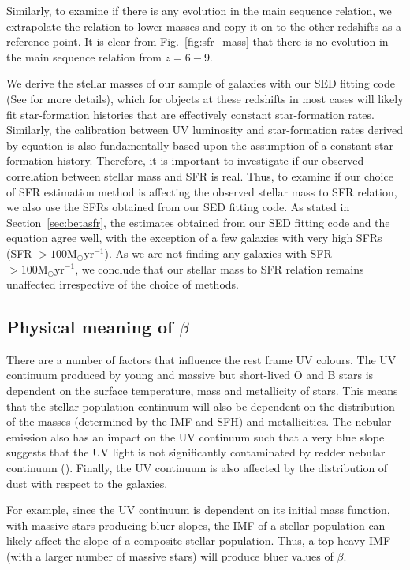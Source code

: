 \documentclass[twocolumn]{aastex63}
\begin{document}
Similarly, to examine if there is any evolution in the main sequence relation, we extrapolate the \citet{Bauer2011} relation to lower masses and copy it on to the other redshifts as a reference point. It is clear from Fig.~\ref{fig:sfr_mass} that there is no evolution in the main sequence relation from $z=6-9$.

We derive the stellar masses of our sample of galaxies with our SED fitting code (See \citet{Bhatawdekar2019} for more details), which for objects at these redshifts in most cases will likely fit star-formation histories that are effectively constant star-formation rates. Similarly, the calibration between UV luminosity and star-formation rates derived by \citet{Kennicutt1998} equation is also fundamentally based upon the assumption of a constant star-formation history. Therefore, it is important to investigate if our observed correlation between stellar mass and SFR is real. Thus, to examine if our choice of SFR estimation method is affecting the observed stellar mass to SFR relation, we also use the SFRs obtained from our SED fitting code. As stated in Section~\ref{sec:betasfr}, the estimates obtained from our SED fitting code and the \citet{Kennicutt1998} equation agree well, with the exception of a few galaxies with very high SFRs (SFR $>100\mathrm{M_{\odot}yr^{-1}}$). As we are not finding any galaxies with SFR $>100\mathrm{M_{\odot}yr^{-1}}$, we conclude that our stellar mass to SFR relation remains unaffected irrespective of the choice of methods.

\subsection{Physical meaning of $\beta$}

There are a number of factors that influence the rest frame UV colours. The UV continuum  produced by young and massive but short-lived O and B stars is dependent on the surface temperature, mass and metallicity of stars. This means that the stellar population continuum will also be dependent on the distribution of the masses (determined by the IMF and SFH) and metallicities. The nebular emission also has an impact on the UV continuum such that a very blue slope suggests that the UV light is not significantly contaminated by redder nebular continuum (\citealt{Dunlop2012, Robertson2010}). Finally, the UV continuum is also affected by the distribution of dust with respect to the galaxies.

For example, since the UV continuum is dependent on its initial mass function, with massive stars producing bluer slopes, the IMF of a stellar population can likely affect the slope of a composite stellar population. Thus, a top-heavy IMF (with a larger number of massive stars) will produce bluer values of $\beta$.
\end{document}
